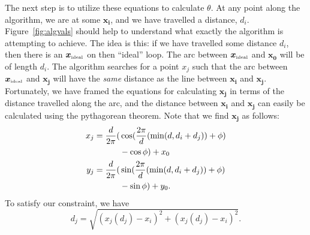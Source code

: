 \documentclass[twocolumn,12pt]{article}
\begin{document}
The next step is to utilize these equations to calculate $\theta$. At any point
along the algorithm, we are at some $\bm{x_i}$, and we have travelled a
distance, $d_i$. Figure~\ref{fig:algvals} should help to understand what exactly
the algorithm is attempting to achieve. The idea is this: if we have travelled
some distance $d_i$, then there is an $\bm{x}_{\mbox{{\tiny ideal}}}$ on then
``ideal'' loop. The arc between $\bm{x}_{\mbox{{\tiny ideal}}}$ and $\bm{x_0}$
will be of length $d_i$. The algorithm searches for a point $x_j$ such that the
arc between $\bm{x}_{\mbox{{\tiny ideal}}}$ and $\bm{x_j}$ will have the
\emph{same} distance as the line between $\bm{x_i}$ and $\bm{x_j}$. Fortunately,
we have framed the equations for calculating $\bm{x_j}$ in terms of the distance
travelled along the arc, and the distance between $\bm{x_i}$ and $\bm{x_j}$ can
easily be calculated using the pythagorean theorem. Note that we find $\bm{x_j}$
as follows:
\begin{align}
  x_j = \frac{d}{2\pi} ( & \cos( \frac{ 2 \pi }{ d } ( \min( d, d_i + d_j ) )
                                  + \phi ) \notag \\ & - \cos \phi ) + x_0
                                  \label{eq:xj} \\
  y_j = \frac{d}{2\pi} ( & \sin( \frac{ 2 \pi }{ d } ( \min( d, d_i + d_j ) )
                                  + \phi ) \notag \\ & - \sin \phi ) + y_0.
                                  \label{eq:yj}
\end{align}
To satisfy our constraint, we have
\begin{equation}
d_j = \sqrt{ ( x_j(d_j) - x_i )^2 + ( x_j(d_j) - x_i )^2 }. \label{eq:dj}
\end{equation}
\end{document}
